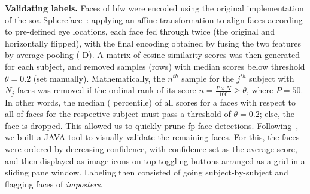 \vspace{1mm}
\noindent\textbf{Validating labels.} 
Faces of \gls{bfw} were encoded using the original implementation of the \gls{soa} Sphereface~\cite{liu2017sphereface}: applying an affine transformation to align faces according to pre-defined eye locations, each face fed through twice (\ie the original and horizontally flipped), with the final encoding obtained by fusing the two features by average pooling ( D). A matrix of cosine similarity scores was then generated for each subject, and removed samples (\ie rows) with median scores below threshold $\theta=0.2$ (set manually). Mathematically, the $n^{th}$ sample for the $j^{th}$ subject with $N_j$ faces was removed if the ordinal rank of its score $n = \frac{P\times N}{100}\geq\theta$, where $P=50$. In other words, the median ( percentile) of all scores for a faces with respect to all of faces for the respective subject must pass a threshold of $\theta=0.2$; else, the face is dropped. This allowed us to quickly prune \gls{fp} face detections. Following~\cite{robinson2016families, robinson2018visual}, we built a JAVA tool to visually validate the remaining faces. For this, the faces were ordered by decreasing confidence, with confidence set as the average score, and then displayed as image icons on top toggling buttons arranged as a grid in a sliding pane window. Labeling then consisted of going subject-by-subject and flagging faces of \emph{imposters}.


